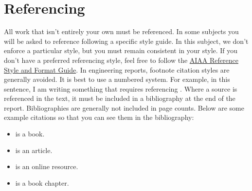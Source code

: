 \section{Referencing}
All work that isn't entirely your own must be referenced. In some subjects you will be asked to reference following a specific style guide. In this subject, we don't enforce a particular style, but you must remain consistent in your style. If you don't have a preferred referencing style, feel free to follow the \href{https://www.aiaa.org/publications/journals/reference-style-and-format}{AIAA Reference Style and Format Guide}. In engineering reports, footnote citation styles are generally avoided. It is best to use a numbered system. For example, in this sentence, I am writing something that requires referencing \cite{dirac}. Where a source is referenced in the text, it must be included in a bibliography at the end of the report. Bibliographies are generally not included in page counts. Below are some example citations so that you can see them in the bibliography:
\begin{itemize}
    \item \cite{dirac} is a book.
    \item \cite{einstein} is an article.
    \item \cite{knuthwebsite} is an online resource.
    \item \cite{knuth-fa} is a book chapter.
\end{itemize}